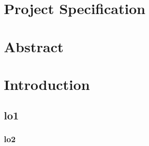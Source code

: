 \documentclass[12pt, letterpaper]{article}            %
\newcommand{\footrulecolor}[1]{\patchcmd{\footrule}{\hrule}{\color{#1}\hrule}{}{}} %
\begin{document}
\section*{Project Specification}
\lipsum[1]
\newpage

\section*{Abstract}
\lipsum[1]
\newpage

\tableofcontents
\newpage

\fancyfoot{} %
\renewcommand{\footrulewidth}{0.4pt} %
\footrulecolor{linec}

\section{Introduction}
\lipsum[1-10]
\subsection{lo1}
\lipsum[1-10]
\subsubsection{lo2}
\lipsum[1-10]
\end{document}
